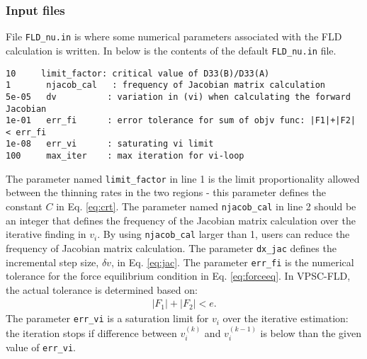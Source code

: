 \documentclass[12pt]{amsart}
\begin{document}
\subsubsection{Input files}%
\label{sec:input}
File \verb$FLD_nu.in$ is where some numerical parameters associated with the FLD calculation is written.
In below is the contents of the default \verb$FLD_nu.in$ file.
\begin{lstlisting}[style=inp, caption=Contents of FLD\_nu.in,label={code:fld_nu.in}]
10     limit_factor: critical value of D33(B)/D33(A)
1       njacob_cal   : frequency of Jacobian matrix calculation
5e-05   dv          : variation in (vi) when calculating the forward Jacobian
1e-01   err_fi      : error tolerance for sum of objv func: |F1|+|F2| < err_fi
1e-08   err_vi      : saturating vi limit
100     max_iter    : max iteration for vi-loop
\end{lstlisting}
The parameter named \verb$limit_factor$ in line 1 is the limit proportionality allowed between the thinning rates in the two regions - this parameter defines the constant $C$ in Eq. \ref{eq:crt}.
The parameter named \verb$njacob_cal$ in line 2 should be an integer that defines the frequency of the Jacobian matrix calculation over the iterative finding in $v_i$.
By using \verb$njacob_cal$ larger than 1, users can reduce the frequency of Jacobian matrix calculation.
The parameter \verb$dx_jac$ defines the incremental step size, $\delta{v}$, in Eq. \ref{eq:jac}.
The parameter \verb$err_fi$ is the numerical tolerance for the force equilibrium condition in Eq. \ref{eq:forceeq}.
In VPSC-FLD, the actual tolerance is determined based on: \begin{eqnarray} \label{eq:forceeq2} |F_1|+|F_2|<e. \end{eqnarray}
The parameter \verb$err_vi$ is a saturation limit for $v_i$ over the iterative estimation:
the iteration stops if difference between $v_i^{(k)}$ and $v_i^{(k-1)}$ is below than the given value of \verb$err_vi$.
\end{document}
